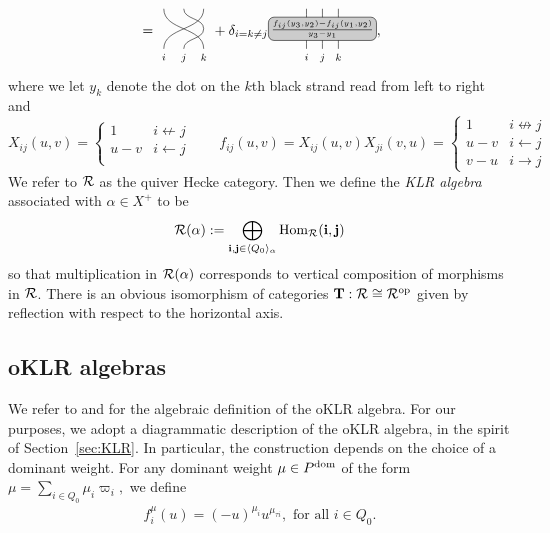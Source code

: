 \begin{gather}
\begin{tikzpicture}
    \end{tikzpicture}
    =
        \begin{tikzpicture}
        [baseline=1em]
        \draw (0,0) \botlabel{i} \braidup (1,1);
    \draw (1,0) \botlabel{k} \braidup (0,1);
    \draw (.5,0) \botlabel{j} \braidup (1,.5) \braidup (.5,1);
    \end{tikzpicture}
    +\delta_{i=k\neq j}
    \begin{tikzpicture}
        [baseline=1em]
        \draw (0,0) \botlabel{i} \braidup (0,1);
    \draw (.8,0) \botlabel{k} \braidup (.8,1);
    \draw (.4,0) \botlabel{j} \braidup (.4,.5) \braidup (.4,1);
    \coupon{.4,.5}{\frac{f_{ij}(y_3,y_2)-f_{ij}(y_1,y_2)}{y_3-y_1}};
    \end{tikzpicture},
\end{gather}
where we let $y_k$ denote the dot on the $k$th black strand read from
left to right and
\[X_{ij}(u,v)= \begin{cases}
  1 & i \not \leftarrow j\\
 u-v & i\leftarrow j\\
\end{cases} \qquad f_{ij}(u,v)=X_{ij}(u,v)X_{ji}(v,u)=
\begin{cases}
  1 & i \not \leftrightarrow j\\
 u-v & i\leftarrow j\\
v-u & i\to j
\end{cases}
\]
We refer to $\mathcal{R}$ as the quiver Hecke category. Then we define the {\em KLR algebra} associated with $\alpha\in X^+$ to be 
\[
\mathcal{R}(\alpha):=\bigoplus_{\mathbf{i},\mathbf{j}\in \langle Q_0\rangle_{\alpha}} \operatorname{Hom}_{\mathcal{R}}(\mathbf{i},\mathbf{j})
\]
 so that multiplication in $\mathcal{R}(\alpha)$ corresponds to vertical composition of morphisms in $\mathcal{R}$. There is an obvious isomorphism of categories $\mathbf{T}:\mathcal{R} \cong \mathcal{R}^{\textup{op}}$ given by reflection with respect to the horizontal axis.



\subsection{oKLR algebras}
\label{sec:oKLR}


We refer to \cite[Definition~5.1]{VV11} and \cite[Definition~2.4]{Prz23} for the algebraic definition of the oKLR algebra.  
For our purposes, we adopt a diagrammatic description of the oKLR algebra, in the spirit of Section~\ref{sec:KLR}.  
In particular, the construction depends on the choice of a dominant weight.  
For any dominant weight $\mu\in P^{\text{dom}}$ of the form
\(
\mu = \sum_{i \in Q_0} \mu_i \varpi_i ,
\)
we define
\begin{gather}
    \label{fi}
    f^\mu_i(u)=(-u)^{\mu_i} u^{\mu_{\tau i}}, \text{ for all }i\in Q_0.
\end{gather}


